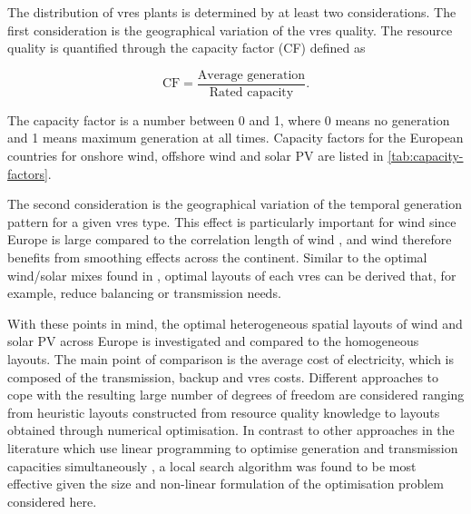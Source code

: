 \documentclass[a4paper, 5p, sort&compress]{elsarticle}%
\begin{document}
The distribution of \gls{vres} plants is determined by at least two considerations.
The first consideration is the geographical
variation of the \gls{vres}
quality. %
The resource quality is quantified through the capacity factor (CF) defined as

\begin{equation}
  \label{eq:1}
  \mbox{CF} = \frac{\mbox{Average generation}}{\mbox{Rated capacity}} .
\end{equation}

The capacity factor is a number between 0 and 1, where 0 means no
generation and 1 means maximum generation at all times. Capacity
factors for the European countries for onshore wind, offshore wind and
solar PV are listed in \cref{tab:capacity-factors}.

The second consideration is the geographical variation of the temporal generation pattern for a
given \gls{vres} type. This effect is particularly important for wind since Europe is large
compared to the correlation length of wind %
\cite{Widen2011}, and wind therefore benefits from smoothing effects across the
continent. Similar to the optimal wind/solar mixes found in \cite{Heide2010,Heide2011}, optimal
layouts of each \gls{vres} can be derived that, for example, reduce balancing or transmission
needs.

With these points in mind, the optimal heterogeneous spatial layouts
of wind and solar PV across Europe is investigated and compared to the
homogeneous layouts. The main point of comparison is the average cost
of electricity, which is composed of the transmission, backup and \gls{vres}
costs.  Different approaches to cope with the resulting large number
of degrees of freedom are considered ranging from heuristic layouts
constructed from resource quality knowledge to layouts obtained
through numerical optimisation. In contrast to other approaches in the
literature which use linear programming to optimise
generation and transmission capacities simultaneously \cite{Czisch,Hagspiel}, a
local search algorithm was found to be most effective given the size
and non-linear formulation of the optimisation problem considered here.
\end{document}
